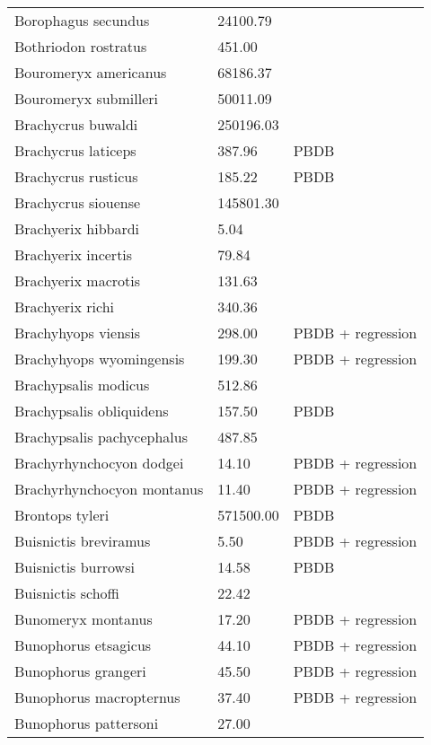 \documentclass{article}
\begin{document}
\begin{center}
\begin{longtable}{p{} p{} p{}}
    Borophagus secundus & 24100.79 & \cite{Tomiya2013} \\ 
    Bothriodon rostratus & 451.00 & \cite{Cassiliano2008} \\ 
    Bouromeryx americanus & 68186.37 & \cite{Tomiya2013} \\ 
    Bouromeryx submilleri & 50011.09 & \cite{Tomiya2013} \\ 
    Brachycrus buwaldi & 250196.03 & \cite{Tomiya2013} \\ 
    Brachycrus laticeps & 387.96 & PBDB \\ 
    Brachycrus rusticus & 185.22 & PBDB \\ 
    Brachycrus siouense & 145801.30 & \cite{Tomiya2013} \\ 
    Brachyerix hibbardi & 5.04 & \cite{Clemens2011} \\ 
    Brachyerix incertis & 79.84 & \cite{Tomiya2013} \\ 
    Brachyerix macrotis & 131.63 & \cite{Tomiya2013} \\ 
    Brachyerix richi & 340.36 & \cite{Tomiya2013} \\ 
    Brachyhyops viensis & 298.00 & PBDB + regression \\ 
    Brachyhyops wyomingensis & 199.30 & PBDB + regression \\ 
    Brachypsalis modicus & 512.86 & \cite{Tomiya2013} \\ 
    Brachypsalis obliquidens & 157.50 & PBDB \\ 
    Brachypsalis pachycephalus & 487.85 & \cite{Tomiya2013} \\ 
    Brachyrhynchocyon dodgei & 14.10 & PBDB + regression \\ 
    Brachyrhynchocyon montanus & 11.40 & PBDB + regression \\ 
    Brontops tyleri & 571500.00 & PBDB \\ 
    Buisnictis breviramus & 5.50 & PBDB + regression \\ 
    Buisnictis burrowsi & 14.58 & PBDB \\ 
    Buisnictis schoffi & 22.42 & \cite{Tomiya2013} \\ 
    Bunomeryx montanus & 17.20 & PBDB + regression \\ 
    Bunophorus etsagicus & 44.10 & PBDB + regression \\ 
    Bunophorus grangeri & 45.50 & PBDB + regression \\ 
    Bunophorus macropternus & 37.40 & PBDB + regression \\ 
    Bunophorus pattersoni & 27.00 & \cite{Macdonald1956} \\ 

\end{longtable}
\end{center}
\end{document}
